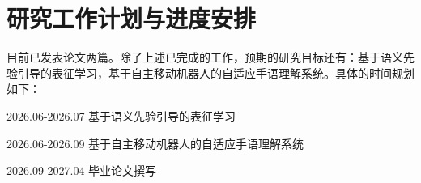 \chapter{研究工作计划与进度安排}

目前已发表论文两篇\citep{peng2025synthetic,peng2026visl}。除了上述已完成的工作，预期的研究目标还有：基于语义先验引导的表征学习，基于自主移动机器人的自适应手语理解系统。具体的时间规划如下：

2026.06-2026.07 基于语义先验引导的表征学习

2026.06-2026.09 基于自主移动机器人的自适应手语理解系统

2026.09-2027.04 毕业论文撰写
